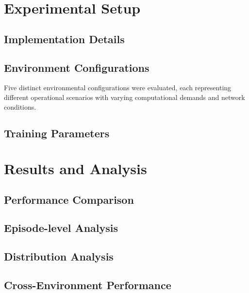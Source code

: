 \documentclass[journal]{IEEEtran}
\begin{document}
\section{Experimental Setup}
\label{sec:experimental_setup}

\subsection{Implementation Details}

\subsection{Environment Configurations}
Five distinct environmental configurations were evaluated, each representing different operational scenarios with varying computational demands and network conditions.

\subsection{Training Parameters}

\section{Results and Analysis}
\label{sec:results}

\subsection{Performance Comparison}

\subsection{Episode-level Analysis}

\subsection{Distribution Analysis}

\subsection{Cross-Environment Performance}
\end{document}
